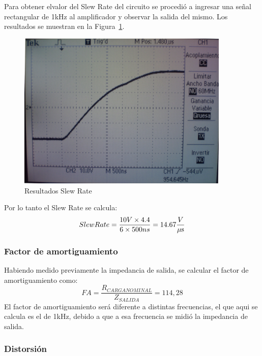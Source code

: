 Para obtener elvalor del Slew Rate del circuito se procedió a ingresar una señal rectangular de 1kHz al amplificador y observar la salida del mismo. Los resultados se muestran en la Figura~\ref{slew_rate_completo}.

\begin{figure}[H]
\centering
\includegraphics[width=0.9\textwidth]{img/slew_rate_salida.jpg}
\caption{Resultados Slew Rate}
\label{slew_rate_completo} 
\end{figure}


Por lo tanto el Slew Rate se calcula:
$$
Slew Rate =\frac{10V \times 4.4}{6 \times 500ns} = 14.67 \frac{V}{\mu\mbox{s}}
$$
\medskip
\subsubsection{Factor de amortiguamiento}

Habiendo medido previamente la impedancia de salida, se calcular el factor de amortiguamiento
como: 
$$
FA = \frac{R_{CARGA NOMINAL}}{Z_{SALIDA}} = 114,28
$$
El factor de amortiguamiento será diferente a distintas frecuencias, el que aqui se calcula es el de 1kHz, debido a que a esa frecuencia se midió la impedancia de salida.

\subsubsection{Distorsión}

